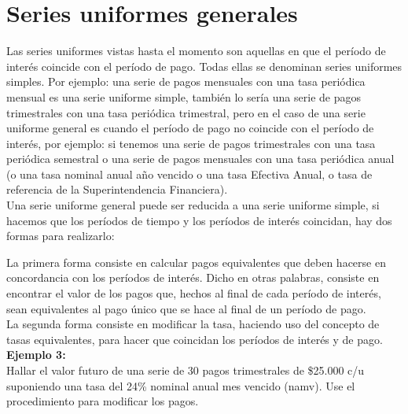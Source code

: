 \section{Series uniformes generales}

Las series uniformes vistas hasta el momento son aquellas en que el período de interés coincide con el período de pago. Todas ellas se denominan series uniformes simples.  Por  ejemplo:  una  serie  de  pagos  mensuales  con  una  tasa  periódica mensual  es  una  serie  uniforme  simple,  también  lo  sería  una  serie  de  pagos trimestrales con una tasa periódica trimestral, pero en el caso de una serie uniforme general es  cuando  el  período de  pago  no  coincide  con el período  de interés,  por ejemplo: si tenemos una serie de pagos trimestrales con una tasa periódica semestral o una serie de pagos mensuales con una tasa periódica anual (o una tasa nominal anual año vencido o una tasa Efectiva Anual, o tasa de referencia de la Superintendencia Financiera).\\

Una serie uniforme general puede ser reducida a una serie uniforme simple, si hacemos que los períodos de tiempo y los períodos de interés coincidan, hay dos formas para realizarlo:

La primera forma consiste en calcular pagos equivalentes que deben hacerse en concordancia con los períodos de interés.  Dicho en otras palabras, consiste en encontrar el valor de los pagos que, hechos al final de cada período de interés, sean equivalentes al pago único que se hace al final de un período de pago.\\

La segunda forma consiste en modificar la tasa, haciendo uso del concepto de tasas equivalentes, para hacer que coincidan los períodos de interés y de pago.\\

\textbf{Ejemplo 3:}\\
Hallar el valor futuro de una serie de 30 pagos trimestrales de \$25.000 c/u suponiendo una tasa del 24\% nominal anual mes vencido (namv). Use el procedimiento para modificar los pagos.\\

